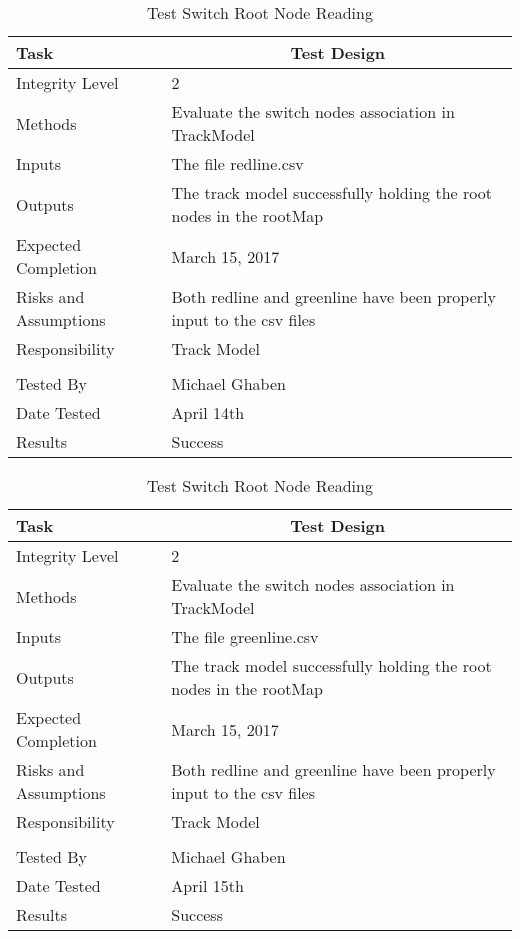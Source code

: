 \documentclass[]{article}
\begin{document}
\begin{table}[H]
	\centering
	\caption{Test Switch Root Node Reading}
	\begin{tabular}{|l|l|}
		\hline
		Task & \multicolumn{1}{c|}{Test Design} \\ \hline
		Integrity Level & 2 \\ \hline
		Methods & \parbox[t]{10cm}{Evaluate the switch nodes association in TrackModel}\\ \hline
		Inputs &  The file redline.csv \\ \hline
		Outputs &  The track model successfully holding the root nodes in the rootMap\\ \hline
		Expected Completion & March 15, 2017\\ \hline
		Risks and Assumptions & Both redline and greenline have been properly input to the csv files \\ \hline
		Responsibility & Track Model\\ \hline
		\\ \hline
		Tested By   &  Michael Ghaben\\	\hline
		Date Tested & \parbox[t]{10cm}{April 14th}\\ \hline
		Results &Success\\ \hline

	\end{tabular}
\end{table}

\begin{table}[H]
	\centering
	\caption{Test Switch Root Node Reading}
	\begin{tabular}{|l|l|}
		\hline
		Task & \multicolumn{1}{c|}{Test Design} \\ \hline
		Integrity Level & 2 \\ \hline
		Methods & Evaluate the switch nodes association in TrackModel\\ \hline
		Inputs &  The file greenline.csv \\ \hline
		Outputs &  The track model successfully holding the root nodes in the rootMap\\ \hline
		Expected Completion & March 15, 2017\\ \hline
		Risks and Assumptions & Both redline and greenline have been properly input to the csv files \\ \hline
		Responsibility & Track Model\\ \hline
		\\ \hline
		Tested By   &  Michael Ghaben\\	\hline
		Date Tested & \parbox[t]{10cm}{April 15th}\\ \hline
		Results & Success\\ \hline

	\end{tabular}
\end{table}
\end{document}
